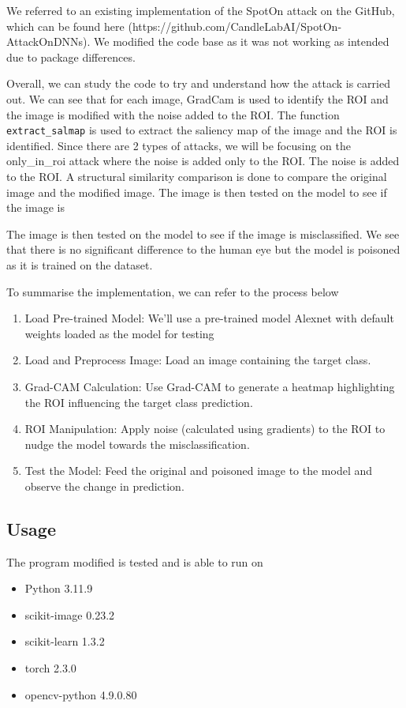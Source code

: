 \documentclass{article}
\newcommand{\code}[1]{\lstinline|#1|}
\begin{document}
We referred to an existing implementation of the SpotOn attack on the GitHub, which
can be found here (https://github.com/CandleLabAI/SpotOn-AttackOnDNNs). We modified
the code base as it was not working as intended due to package differences.

Overall, we can study the code to try and understand how the attack is carried out.
We can see that for each image, GradCam is used to identify the ROI and the
image is modified with the noise added to the ROI. The function \code{extract_salmap}
is used to extract the saliency map of the image and the ROI is identified. Since
there are 2 types of attacks, we will be focusing on the only\_in\_roi attack
where the noise is added only to the ROI. The noise is added to the ROI. A
structural similarity comparison is done to compare the original image and the
modified image. The image is then tested on the model to see if the image is

The image is then tested on
the model to see if the image is misclassified. We see that there is
no significant difference to the human eye but the model is poisoned as it is
trained on the dataset.

To summarise the implementation, we can refer to the process below

\begin{enumerate}
      \item Load Pre-trained Model: We'll use a pre-trained model Alexnet with
      default weights loaded as the model for testing
      \item Load and Preprocess Image: Load an image containing the target class.
      \item Grad-CAM Calculation: Use Grad-CAM to generate a heatmap highlighting the ROI influencing the target class prediction.
      \item ROI Manipulation: Apply noise (calculated using gradients) to the ROI to nudge the model towards the misclassification.
      \item Test the Model: Feed the original and poisoned image to the model and observe the change in prediction.
\end{enumerate}

\subsection{Usage}

The program modified is tested and is able to run on

\begin{itemize}
      \item Python 3.11.9
      \item scikit-image 0.23.2
      \item scikit-learn 1.3.2
      \item torch 2.3.0
      \item opencv-python 4.9.0.80
\end{itemize}
\end{document}
